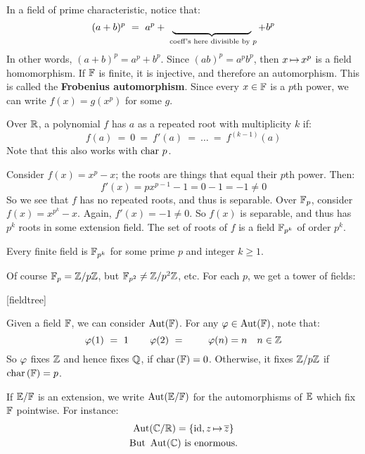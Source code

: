 In a field of prime characteristic, notice that:
\begin{equation*}
    (a+b)^{p} \ = \ a^{p} + \underbrace{\qquad \qquad \qquad \qquad}_{\textrm{
            coeff's here divisible by }p} + b^{p}
\end{equation*}
In other words, $ (a+b)^{p} = a^{p}+b^{p} $.
Since $ (ab)^{p}=a^{p}b^{p} $, then $ x \operatorname{\mapsto} x^{p} $ is a field homomorphism.
If $ \mathbb{F} $ is finite, it is injective, and therefore an automorphism. This is
called the \textbf{Frobenius automorphism}.
Since every $ x \in \mathbb{F} $ is a $ p $th power, we can write $ f(x)=g(x^{p}) $ for
some $ g $.

Over $ \mathbb{R} $, a polynomial $ f $ has $ a $ as a repeated root with multiplicity
$ k $ if:
\begin{equation*}
    f(a) \ = \ 0 \ = \ f'(a) \ = \ \dots \ = \ f^{(k-1)}(a)
\end{equation*}
Note that this also works with $ \operatorname{char\,} p $.

Consider $ f(x)=x^{p}-x $; the roots are things that equal their $ p $th power.
Then:
\begin{equation*}
    f'(x) = px^{p-1}-1 = 0 - 1 = -1 \neq 0
\end{equation*}
So we see that $ f $ has no repeated roots, and thus is separable.
Over $ \mathbb{F}_{p} $, consider $ f(x)=x^{p^{k}} - x $. Again, $ f'(x) = -1 \neq 0 $.
So $ f(x) $ is separable, and thus has $ p^{k} $ roots in some extension field.
The set of roots of $ f $ is a field $ \mathbb{F}_{p^{k}} $ of order $ p^{k} $.

\begin{thm}
    Every finite field is $ \mathbb{F}_{p^{k}} $ for some prime $ p $ and integer
    $ k \geq 1 $.
\end{thm}
Of course $ \mathbb{F}_{p} = \mathbb{Z}/p\mathbb{Z} $, but $ \mathbb{F}_{p^{2}} \neq \mathbb{Z}/p^{2}\mathbb{Z} $, etc.
For each $ p $, we get a tower of fields:

[fieldtree]

Given a field $ \mathbb{F} $, we can consider $ \operatorname{Aut}(\mathbb{F}) $.
For any $ \operatorname{\varphi} \in \operatorname{Aut}(\mathbb{F}) $, note that:
\begin{equation*}
    \operatorname{\varphi}(1) \ = \ 1 \qquad \operatorname{\varphi}(2) \ = \ \qquad \operatorname{\varphi}(n) = n \quad n \in \mathbb{Z}
\end{equation*}
So $ \operatorname{\varphi} $ fixes $ \mathbb{Z} $ and hence fixes $ \mathbb{Q} $, if $ \operatorname{char\,}(\mathbb{F}) = 0 $.
Otherwise, it fixes $ \mathbb{Z}/p\mathbb{Z} $ if $ \operatorname{char\,}(\mathbb{F}) = p $.

If $ \mathbb{E}/\mathbb{F} $ is an extension, we write $ \operatorname{Aut}(\mathbb{E}/\mathbb{F}) $ for the automorphisms
of $ \mathbb{E} $ which fix $ \mathbb{F} $ pointwise. For instance:
\begin{gather*}
    \operatorname{Aut}(\mathbb{C}/\mathbb{R}) = \left\{{\textrm{id}, z \operatorname{\mapsto} \overline{z}}\right\} \\
    \textrm{But } \operatorname{Aut}(\mathbb{C}) \textrm{ is enormous.}
\end{gather*}

